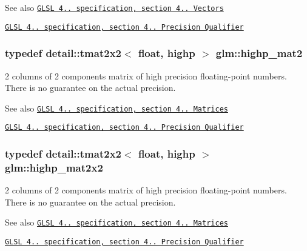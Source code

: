 \begin{DoxySeeAlso}{See also}
\href{http://www.opengl.org/registry/doc/GLSLangSpec.4.20.8.pdf}{\tt G\+L\+SL 4.. specification, section 4.. Vectors} 

\href{http://www.opengl.org/registry/doc/GLSLangSpec.4.20.8.pdf}{\tt G\+L\+SL 4.. specification, section 4.. Precision Qualifier} 
\end{DoxySeeAlso}
\subsubsection[{\texorpdfstring{highp\+\_\+mat2}{highp_mat2}}]{\setlength{\rightskip}{0pt plus 5cm}typedef detail\+::tmat2x2$<$ float, highp $>$ {\bf glm\+::highp\+\_\+mat2}}\hypertarget{group__core__precision_gab9884251d84b95dbbf27aa1e4b3a1ec7}{}\label{group__core__precision_gab9884251d84b95dbbf27aa1e4b3a1ec7}
2 columns of 2 components matrix of high precision floating-\/point numbers. There is no guarantee on the actual precision.

\begin{DoxySeeAlso}{See also}
\href{http://www.opengl.org/registry/doc/GLSLangSpec.4.20.8.pdf}{\tt G\+L\+SL 4.. specification, section 4.. Matrices} 

\href{http://www.opengl.org/registry/doc/GLSLangSpec.4.20.8.pdf}{\tt G\+L\+SL 4.. specification, section 4.. Precision Qualifier} 
\end{DoxySeeAlso}
\subsubsection[{\texorpdfstring{highp\+\_\+mat2x2}{highp_mat2x2}}]{\setlength{\rightskip}{0pt plus 5cm}typedef detail\+::tmat2x2$<$ float, highp $>$ {\bf glm\+::highp\+\_\+mat2x2}}\hypertarget{group__core__precision_ga694146b8d430b22caa8b37571d9bc8bc}{}\label{group__core__precision_ga694146b8d430b22caa8b37571d9bc8bc}
2 columns of 2 components matrix of high precision floating-\/point numbers. There is no guarantee on the actual precision.

\begin{DoxySeeAlso}{See also}
\href{http://www.opengl.org/registry/doc/GLSLangSpec.4.20.8.pdf}{\tt G\+L\+SL 4.. specification, section 4.. Matrices} 

\href{http://www.opengl.org/registry/doc/GLSLangSpec.4.20.8.pdf}{\tt G\+L\+SL 4.. specification, section 4.. Precision Qualifier} 
\end{DoxySeeAlso}
